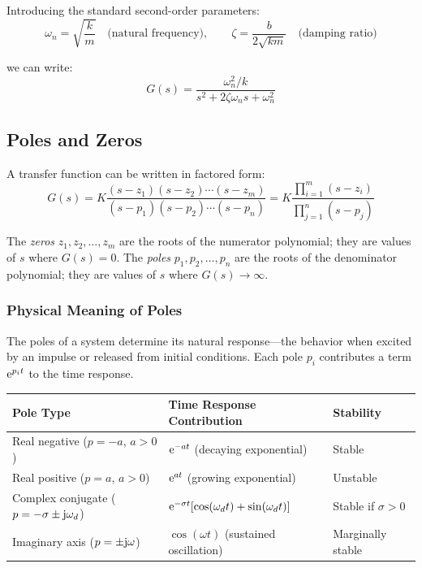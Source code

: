 Introducing the standard second-order parameters:
\begin{equation}
\omega_n = \sqrt{\frac{k}{m}} \quad \text{(natural frequency)}, \qquad \zeta = \frac{b}{2\sqrt{km}} \quad \text{(damping ratio)}
\end{equation}

we can write:
\begin{equation}
G(s) = \frac{\omega_n^2/k}{s^2 + 2\zeta\omega_n s + \omega_n^2}
\label{eq:msd_standard}
\end{equation}

\subsection{Poles and Zeros}
\label{sec:poles_zeros}

A transfer function can be written in factored form:
\begin{equation}
G(s) = K\frac{(s-z_1)(s-z_2)\cdots(s-z_m)}{(s-p_1)(s-p_2)\cdots(s-p_n)} = K\frac{\prod_{i=1}^{m}(s-z_i)}{\prod_{j=1}^{n}(s-p_j)}
\label{eq:pole_zero_form}
\end{equation}

\begin{definition}
The \textit{zeros} $z_1, z_2, \ldots, z_m$ are the roots of the numerator polynomial; they are values of $s$ where $G(s) = 0$. The \textit{poles} $p_1, p_2, \ldots, p_n$ are the roots of the denominator polynomial; they are values of $s$ where $G(s) \to \infty$.
\end{definition}

\subsubsection{Physical Meaning of Poles}

The poles of a system determine its natural response---the behavior when excited by an impulse or released from initial conditions. Each pole $p_i$ contributes a term $\mathrm{e}^{p_i t}$ to the time response.

\begin{table}[h]
\centering
\begin{tabular}{@{}lll@{}}
\toprule
\textbf{Pole Type} & \textbf{Time Response Contribution} & \textbf{Stability} \\
\midrule
Real negative ($p = -a$, $a > 0$) & $\mathrm{e}^{-at}$ (decaying exponential) & Stable \\
Real positive ($p = a$, $a > 0$) & $\mathrm{e}^{at}$ (growing exponential) & Unstable \\
Complex conjugate ($p = -\sigma \pm \mathrm{j}\omega_d$) & $\mathrm{e}^{-\sigma t}[\cos(\omega_d t) + \sin(\omega_d t)]$ & Stable if $\sigma > 0$ \\
Imaginary axis ($p = \pm\mathrm{j}\omega$) & $\cos(\omega t)$ (sustained oscillation) & Marginally stable \\
\bottomrule
\end{tabular}
\end{table}

